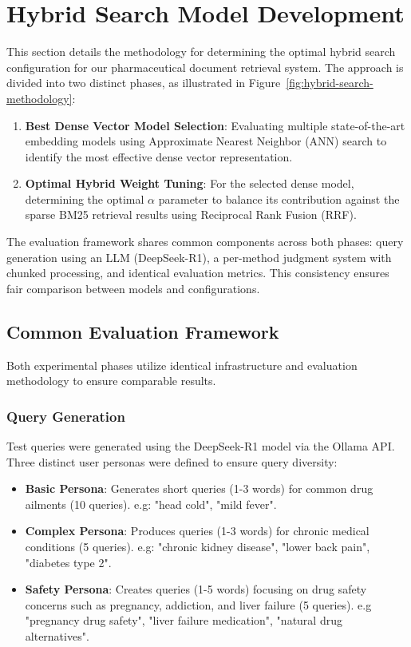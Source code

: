 \section{Hybrid Search Model Development}
\label{sec:hybrid-search-best-model}

This section details the methodology for determining the optimal hybrid search configuration for our pharmaceutical document retrieval system. The approach is divided into two distinct phases, as illustrated in Figure~\ref{fig:hybrid-search-methodology}:

\begin{enumerate}
    \item \textbf{Best Dense Vector Model Selection}: Evaluating multiple state-of-the-art embedding models using Approximate Nearest Neighbor (ANN) search to identify the most effective dense vector representation.
    \item \textbf{Optimal Hybrid Weight Tuning}: For the selected dense model, determining the optimal $\alpha$ parameter to balance its contribution against the sparse BM25 retrieval results using Reciprocal Rank Fusion (RRF).
\end{enumerate}



The evaluation framework shares common components across both phases: query generation using an LLM (DeepSeek-R1), a per-method judgment system with chunked processing, and identical evaluation metrics. This consistency ensures fair comparison between models and configurations.

\subsection{Common Evaluation Framework}
\label{subsec:common-evaluation-framework}

Both experimental phases utilize identical infrastructure and evaluation methodology to ensure comparable results.

\subsubsection{Query Generation}
\label{subsubsec:query-generation}

Test queries were generated using the DeepSeek-R1 model via the Ollama API. Three distinct user personas were defined to ensure query diversity:

\begin{itemize}
    \item \textbf{Basic Persona}: Generates short queries (1-3 words) for common drug ailments (10 queries). e.g: "head cold", "mild fever".
    \item \textbf{Complex Persona}: Produces queries (1-3 words) for chronic medical conditions (5 queries). e.g: "chronic kidney disease", "lower back pain", "diabetes type 2".
    \item \textbf{Safety Persona}: Creates queries (1-5 words) focusing on drug safety concerns such as pregnancy, addiction, and liver failure (5 queries). e.g "pregnancy drug safety", "liver failure medication", "natural drug alternatives".
\end{itemize}

